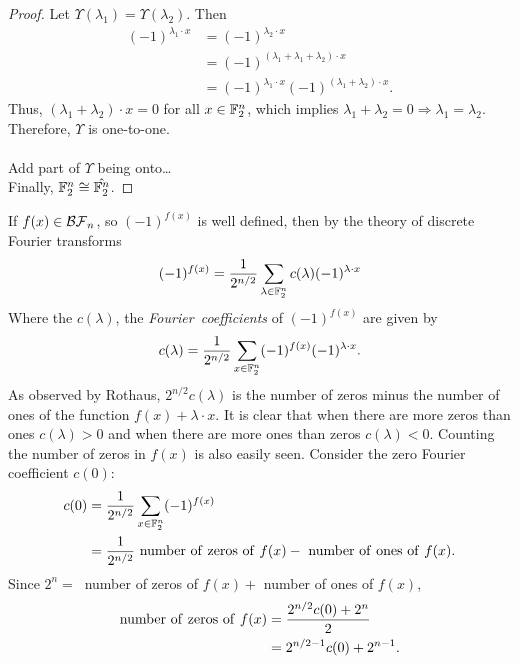 \begin{proof}
	Let $\Upsilon(\lambda_1)=\Upsilon(\lambda_2)$. Then
	\begin{align*}
		(-1)^{\lambda_1\cdot x}&=(-1)^{\lambda_2\cdot x}\\
		                       &=(-1)^{(\lambda_1+\lambda_1+\lambda_2)\cdot x}\\
													 &=(-1)^{\lambda_1\cdot x}(-1)^{(\lambda_1+\lambda_2)\cdot x}.
	\end{align*}
	Thus, $(\lambda_1+\lambda_2)\cdot x=0$ for all $x\in\mathbb{F}_2^n$, which implies
	$\lambda_1+\lambda_2=0\Rightarrow\lambda_1=\lambda_2$. Therefore, $\Upsilon$ is
	one-to-one.\\
	\\
	Add part of $\Upsilon$ being onto\ldots
	\\
	Finally, $\mathbb{F}_2^n\cong\hat{\mathbb{F}_2^n}$.
\end{proof}

	




\par If $f(x)\in\mathcal{BF}_n$, so $(-1)^{f(x)}$ is well defined, then by the
theory of discrete Fourier transforms
\begin{equation}\label{eqn:DFT}
  (-1)^{f(x)}=\frac{1}{2^{n/2}}\sum_{\lambda\in\mathbb{F}_2^n}c(\lambda)(-1)^{\lambda\cdot x}
\end{equation}
Where the $c(\lambda)$, the {\em Fourier\ coefficients} of $(-1)^{f(x)}$ are given by
\[
  c(\lambda)=\frac{1}{2^{n/2}}\sum_{x\in\mathbb{F}_2^n}(-1)^{f(x)}(-1)^{\lambda\cdot x}.
\]
As observed by Rothaus, $2^{n/2}c(\lambda)$ is the number of zeros minus the number
of ones of the function $f(x)+\lambda\cdot x$. It is clear that when there are more
zeros than ones $c(\lambda)>0$ and when there are more ones than zeros $c(\lambda)<0$.
Counting the number of zeros in $f(x)$ is also easily seen. Consider the zero Fourier
coefficient $c(0)$:
\begin{align*}
	c(0)&=\frac{1}{2^{n/2}}\sum_{x\in\gftwo^n}(-1)^{f(x)}\\
	&=\frac{1}{2^{n/2}}{\rm \ number\ of\ zeros\ of\ }f(x)-{\rm \ number\ of \ ones\ of \ }f(x).
\end{align*}
Since $2^n=\ $ number of zeros of $f(x)+$ number of ones of $f(x)$,
\begin{align*}
	{\rm number\ of\ zeros\ of\ }f(x)&=\frac{2^{n/2}c(0)+2^n}{2}\\
	                                 &=2^{n/2-1}c(0)+2^{n-1}.
\end{align*}

